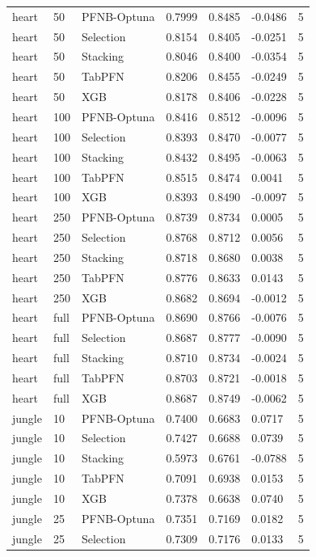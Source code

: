 \begin{tabular}{llllllr}
heart & 50 & PFNB-Optuna & 0.7999 & 0.8485 & -0.0486 & 5 \\
heart & 50 & Selection & 0.8154 & 0.8405 & -0.0251 & 5 \\
heart & 50 & Stacking & 0.8046 & 0.8400 & -0.0354 & 5 \\
heart & 50 & TabPFN & 0.8206 & 0.8455 & -0.0249 & 5 \\
heart & 50 & XGB & 0.8178 & 0.8406 & -0.0228 & 5 \\
heart & 100 & PFNB-Optuna & 0.8416 & 0.8512 & -0.0096 & 5 \\
heart & 100 & Selection & 0.8393 & 0.8470 & -0.0077 & 5 \\
heart & 100 & Stacking & 0.8432 & 0.8495 & -0.0063 & 5 \\
heart & 100 & TabPFN & 0.8515 & 0.8474 & 0.0041 & 5 \\
heart & 100 & XGB & 0.8393 & 0.8490 & -0.0097 & 5 \\
heart & 250 & PFNB-Optuna & 0.8739 & 0.8734 & 0.0005 & 5 \\
heart & 250 & Selection & 0.8768 & 0.8712 & 0.0056 & 5 \\
heart & 250 & Stacking & 0.8718 & 0.8680 & 0.0038 & 5 \\
heart & 250 & TabPFN & 0.8776 & 0.8633 & 0.0143 & 5 \\
heart & 250 & XGB & 0.8682 & 0.8694 & -0.0012 & 5 \\
heart & full & PFNB-Optuna & 0.8690 & 0.8766 & -0.0076 & 5 \\
heart & full & Selection & 0.8687 & 0.8777 & -0.0090 & 5 \\
heart & full & Stacking & 0.8710 & 0.8734 & -0.0024 & 5 \\
heart & full & TabPFN & 0.8703 & 0.8721 & -0.0018 & 5 \\
heart & full & XGB & 0.8687 & 0.8749 & -0.0062 & 5 \\
jungle & 10 & PFNB-Optuna & 0.7400 & 0.6683 & 0.0717 & 5 \\
jungle & 10 & Selection & 0.7427 & 0.6688 & 0.0739 & 5 \\
jungle & 10 & Stacking & 0.5973 & 0.6761 & -0.0788 & 5 \\
jungle & 10 & TabPFN & 0.7091 & 0.6938 & 0.0153 & 5 \\
jungle & 10 & XGB & 0.7378 & 0.6638 & 0.0740 & 5 \\
jungle & 25 & PFNB-Optuna & 0.7351 & 0.7169 & 0.0182 & 5 \\
jungle & 25 & Selection & 0.7309 & 0.7176 & 0.0133 & 5 \\

\end{tabular}
